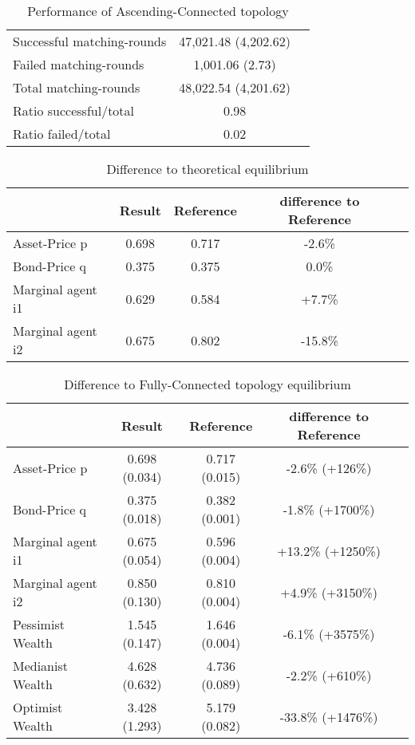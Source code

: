 \documentclass[Bachelorarbeit.tex]{subfiles}
\begin{document}
\begin{table}[H]
	\caption{Performance of Ascending-Connected topology}
	\centering
	\begin{tabular} { l c r }
		\hline
		Successful matching-rounds & 47,021.48 (4,202.62) \\
		Failed matching-rounds & 1,001.06 (2.73) \\
		Total matching-rounds & 48,022.54 (4,201.62) \\
		\hline
		Ratio successful/total & 0.98 \\
		Ratio failed/total & 0.02 \\
		\hline
	\end{tabular}
\end{table}

\begin{table}[H]
	\caption{Difference to theoretical equilibrium}
	\centering
	\begin{tabular} { l c c c r }
		& Result & Reference & difference to Reference \\
		\hline
		Asset-Price p & 0.698 & 0.717 & -2.6\% \\
		Bond-Price q & 0.375 & 0.375 & 0.0\% \\
		Marginal agent i1 & 0.629  & 0.584 & +7.7\% \\
		Marginal agent i2 & 0.675 & 0.802 & -15.8\% \\
		\hline
	\end{tabular}
\end{table}

\begin{table}[H]
	\caption{Difference to Fully-Connected topology equilibrium}
	\centering
	\begin{tabular} { l c c c r }
		& Result & Reference & difference to Reference \\
		\hline
		Asset-Price p & 0.698 (0.034) & 0.717 (0.015) & -2.6\% (+126\%) \\
		Bond-Price q & 0.375 (0.018) & 0.382 (0.001) & -1.8\% (+1700\%) \\
		Marginal agent i1 & 0.675 (0.054) & 0.596 (0.004) & +13.2\% (+1250\%) \\
		Marginal agent i2 & 0.850 (0.130) & 0.810 (0.004) & +4.9\% (+3150\%) \\
		\hline
		Pessimist Wealth & 1.545 (0.147) & 1.646 (0.004) & -6.1\% (+3575\%) \\
		Medianist Wealth & 4.628 (0.632) & 4.736 (0.089) & -2.2\% (+610\%) \\
		Optimist Wealth & 3.428 (1.293) & 5.179 (0.082) & -33.8\% (+1476\%) \\
		\hline
	\end{tabular}
\end{table}
\end{document}
